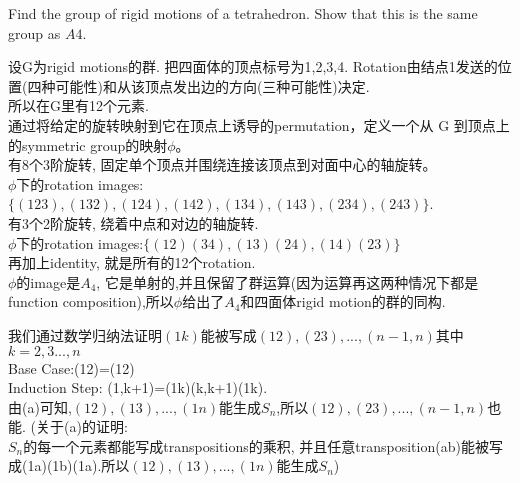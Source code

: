 \documentclass[a4paper, justified]{tufte-handout}
\begin{document}
\begin{problem}[TJ 5-16]
Find the group of rigid motions of a tetrahedron. Show that this is the same group as $A4$.
\end{problem}

\begin{solution}
	设G为rigid motions的群. 把四面体的顶点标号为1,2,3,4. Rotation由结点1发送的位置(四种可能性)和从该顶点发出边的方向(三种可能性)决定.\\
	所以在G里有12个元素.\\
	通过将给定的旋转映射到它在顶点上诱导的permutation，定义一个从 G 到顶点上的symmetric group的映射$\phi$。\\
	有8个3阶旋转, 固定单个顶点并围绕连接该顶点到对面中心的轴旋转。\\
	$\phi$下的rotation images:$\{(123), (132), (124), (142), (134), (143), (234), (243)\}$.\\
	有3个2阶旋转, 绕着中点和对边的轴旋转.\\
	$\phi$下的rotation images:$\{(12)(34), (13)(24), (14)(23)\}$\\
	再加上identity, 就是所有的12个rotation.\\
	$\phi$的image是$A_4$, 它是单射的,并且保留了群运算(因为运算再这两种情况下都是function composition),所以$\phi$给出了$A_4$和四面体rigid motion的群的同构.
\end{solution}

\begin{problem}[TJ 5-26(b)]
\end{problem}

\begin{solution}
	我们通过数学归纳法证明$(1k)$能被写成$(12),(23),...,(n-1,n)$其中$k=2,3...,n$\\
	Base Case:(12)=(12)\\
	Induction Step: (1,k+1)=(1k)(k,k+1)(1k).\\
	由(a)可知,$(12),(13),...,(1n)$能生成$S_n$,所以$(12),(23),...,(n-1,n)$也能.
	(关于(a)的证明:\\
	$S_n$的每一个元素都能写成transpositions的乘积, 并且任意transposition(ab)能被写成(1a)(1b)(1a).所以$(12),(13),...,(1n)$能生成$S_n$)
\end{solution}

\begin{problem}[TJ 5-29]
\end{problem}
\end{document}
